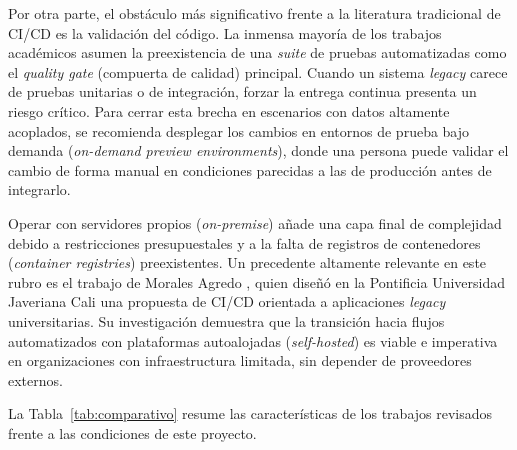 Por otra parte, el obstáculo más significativo frente a la literatura tradicional de CI/CD es la
validación del código. La inmensa mayoría de los trabajos académicos asumen la preexistencia de una
\emph{suite} de pruebas automatizadas como el \emph{quality gate} (compuerta de calidad) principal.
Cuando un sistema \emph{legacy} carece de pruebas unitarias o de integración, forzar la entrega continua
presenta un riesgo crítico. Para cerrar esta brecha en escenarios con datos altamente acoplados,
se recomienda desplegar los cambios en entornos de prueba bajo demanda (\emph{on-demand preview environments}),
donde una persona puede validar el cambio de forma manual en condiciones parecidas a las de producción antes de integrarlo.

Operar con servidores propios (\emph{on-premise})
añade una capa final de complejidad debido a restricciones presupuestales y a la falta de registros de
contenedores (\emph{container registries}) preexistentes. Un precedente altamente relevante en este rubro
es el trabajo de Morales Agredo \cite{MoralesAgredo2021}, quien diseñó en la Pontificia Universidad Javeriana Cali
una propuesta de CI/CD orientada a aplicaciones \emph{legacy} universitarias. Su investigación
demuestra que la transición hacia flujos automatizados con plataformas autoalojadas (\emph{self-hosted})
es viable e imperativa en organizaciones con infraestructura limitada, sin depender de proveedores externos.

La Tabla~\ref{tab:comparativo} resume las características de los trabajos revisados frente a las
condiciones de este proyecto.

